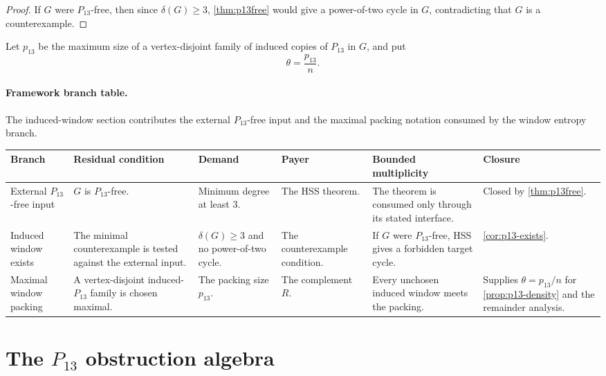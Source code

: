\documentclass[11pt]{article}
\newtheorem{corollary}[theorem]{Corollary}
\newcommand{\FrameworkBranchTableHeader}{%
\toprule
\textbf{Branch} & \textbf{Residual condition} & \textbf{Demand} & \textbf{Payer} & \textbf{Bounded multiplicity} & \textbf{Closure}\\
\midrule
}
\begin{document}

\begin{proof}
If $G$ were $P_{13}$-free, then since $\delta(G)\ge3$, \cref{thm:p13free} would give a power-of-two cycle in $G$, contradicting that $G$ is a counterexample.
\end{proof}

Let $p_{13}$ be the maximum size of a vertex-disjoint family of induced copies of $P_{13}$ in $G$, and put
\[
\theta=\frac{p_{13}}{n}.
\]

\paragraph{Framework branch table.}
The induced-window section contributes the external \(P_{13}\)-free input and
the maximal packing notation consumed by the window entropy branch.
\begin{longtable}{L{0.13\textwidth} L{0.19\textwidth} L{0.14\textwidth} L{0.14\textwidth} L{0.17\textwidth} L{0.17\textwidth}}
\FrameworkBranchTableHeader
External \(P_{13}\)-free input
&
\(G\) is \(P_{13}\)-free.
&
Minimum degree at least \(3\).
&
The HSS theorem.
&
The theorem is consumed only through its stated interface.
&
Closed by \cref{thm:p13free}.
\\
\addlinespace
Induced window exists
&
The minimal counterexample is tested against the external input.
&
\(\delta(G)\ge3\) and no power-of-two cycle.
&
The counterexample condition.
&
If \(G\) were \(P_{13}\)-free, HSS gives a forbidden target cycle.
&
\cref{cor:p13-exists}.
\\
\addlinespace
Maximal window packing
&
A vertex-disjoint induced-\(P_{13}\) family is chosen maximal.
&
The packing size \(p_{13}\).
&
The complement \(R\).
&
Every unchosen induced window meets the packing.
&
Supplies \(\theta=p_{13}/n\) for \cref{prop:p13-density} and the remainder analysis.
\\
\bottomrule
\end{longtable}

\section{The \texorpdfstring{$P_{13}$}{P13} obstruction algebra}
\end{document}

